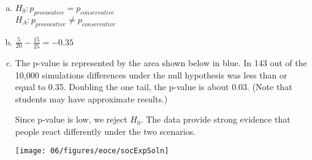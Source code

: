{
\begin{enumerate}[(a)]
\setlength{\itemsep}{0mm}
\item $H_0: p_{provocative} = p_{conservative}$ \\
$H_A: p_{provocative} \ne p_{conservative}$
\item $\frac{5}{20} - \frac{15}{25} = -0.35$
\item The p-value is represented by the area shown below in blue. In 143 out of the 10,000 simulations differences under the null hypothesis was less than or equal to 0.35. Doubling the one tail, the p-value is about 0.03. (Note that students may have approximate results.)

\noindent \begin{minipage}[c]{0.5\textwidth}
Since p-value is low, we reject $H_0$. The data provide strong evidence that people react differently under the two scenarios.
\end{minipage}
\begin{minipage}[c]{0.5\textwidth}
\begin{center}
\texttt{[image: 06/figures/eoce/socExpSoln]}
\end{center}
\end{minipage}
\end{enumerate}
}


